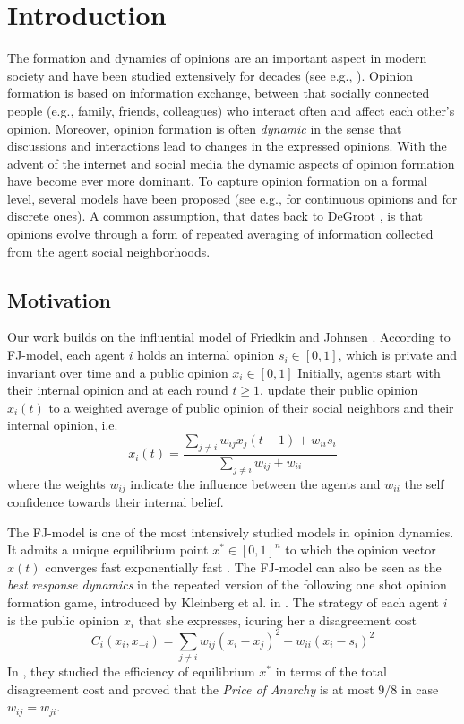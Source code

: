 \section{Introduction}
The formation and dynamics of opinions are an important aspect in modern
society and have been studied extensively for decades (see e.g., \cite{Jackson}).
Opinion formation is based on information exchange, between that socially
connected people (e.g., family, friends, colleagues) who interact often
and affect each other's opinion. Moreover, opinion
formation is often \emph{dynamic} in the sense that discussions and
interactions lead to changes in the expressed opinions. With the
advent of the internet and social media the dynamic aspects of
opinion formation have become ever more dominant. To capture opinion formation
on a formal level, several models have been proposed
(see e.g., \cite{DeGroot,FJ90,HK,BKO11,GS14,BGM13} for
continuous opinions and \cite{FGV12,YOASS13,BFM16} for discrete ones).
A common assumption, that dates back to DeGroot \cite{DeGroot}, is
that opinions evolve through a form of repeated averaging of
information collected from the agent social neighborhoods.

\subsection{Motivation}
Our work builds on the influential model of Friedkin and
Johnsen \cite{FJ90}. According to FJ-model, each agent $i$ holds an
internal opinion $s_i\in [0,1]$, which is private and
invariant over time and a public opinion $x_i \in [0,1]$
Initially, agents start with their internal opinion and at
each round $t\geq1$, update their public opinion
$x_i(t)$ to a weighted average of public opinion of
their social neighbors and their internal opinion, i.e.
\[x_i(t)= \frac{\sum_{j\neq i}w_{ij}x_j(t-1) + w_{ii}s_i}{\sum_{j\neq i}w_{ij}+w_{ii}}\]
where the weights $w_{ij}$ indicate the influence between
the agents and $w_{ii}$ the self confidence towards their
internal belief.

The FJ-model is one of the most intensively studied models
in opinion dynamics. It admits a
unique equilibrium point $x^* \in [0,1]^n$ to which
the opinion vector $x(t)$ converges fast exponentially fast
\cite{GS14}. The FJ-model can also be seen as the \emph{best response
dynamics} in the repeated version of the following one shot
opinion formation game, introduced by Kleinberg et al. in \cite{BKO11}.
The strategy of each agent $i$ is the public opinion $x_i$ that she expresses,
icuring her a disagreement cost \[C_i(x_i,x_{-i})=\sum_{j \neq i}w_{ij}(x_i-x_j)^2 + w_{ii}(x_i-s_i)^2\]
In \cite{BKO11}, they studied the efficiency of equilibrium $x^*$ in terms
of the total disagreement cost and proved that the
\emph{Price of Anarchy} is at most $9/8$ in case $w_{ij}=w_{ji}$.

